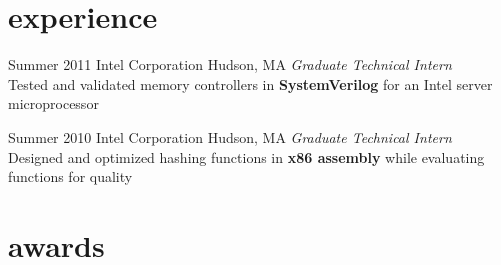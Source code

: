 \documentclass[]{friggeri-cv} %
\begin{document}

\section{experience}


\begin{entrylist}


\entry
{Summer 2011}
{Intel Corporation}
{Hudson, MA}
{\emph{Graduate Technical Intern} \\
  Tested and validated memory controllers in \textbf{SystemVerilog} for an Intel server microprocessor
}

\entry
{Summer 2010}
{Intel Corporation}
{Hudson, MA}
{\emph{Graduate Technical Intern} \\
  Designed and optimized hashing functions in \textbf{x86 assembly} while evaluating functions for quality
}


\end{entrylist}


\section{awards}
\end{document}
